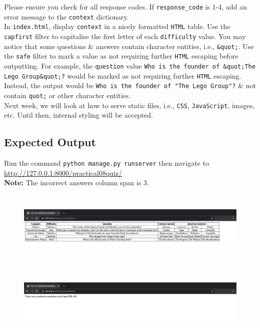 \documentclass{article}
\begin{document}
Please ensure you check for all response codes. If \texttt{response\_code} is 1-4, add an error message to the \texttt{context} dictionary. \\ 

In \texttt{index.html}, display \texttt{context} in a nicely formatted \texttt{HTML} table. Use the \texttt{capfirst} filter to capitalise the first letter of each \texttt{difficulty} value. You may notice that some questions \& answers contain character entities, i.e., \texttt{\&quot;}. Use the \texttt{safe} filter to mark a value as not requiring further \texttt{HTML} escaping before outputting. For example, the \texttt{question} value \texttt{Who is the founder of \&quot;The Lego Group\&quot;?} would be marked as not requiring further \texttt{HTML} escaping. Instead, the output would be \texttt{Who is the founder of "The Lego Group"?} \& not contain \texttt{quot;} or other character entities. \\

Next week, we will look at how to serve static files, i.e., \texttt{CSS}, \texttt{JavaScript}, images, etc. Until then, internal styling will be accepted. 

\subsection*{Expected Output} 
Run the command \texttt{python manage.py runserver} then navigate to \href{http://127.0.0.1:8000/practical08quiz/}{http://127.0.0.1:8000/practical08quiz/} \\

\textbf{Note:} The incorrect answers column span is 3.

\begin{figure}[H]
  \includegraphics[width=175mm, height=35mm]{./img/08-expected-quiz-1.png}
\end{figure}

\begin{figure}[H]
  \includegraphics[width=175mm, height=35mm]{./img/08-expected-quiz-2.png}
\end{figure}
\end{document}
